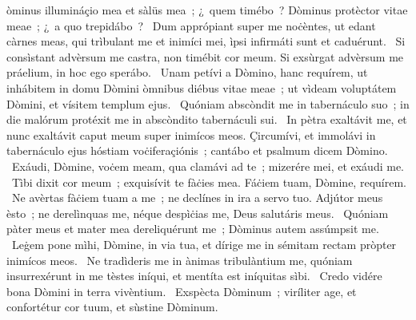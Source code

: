 \psalmChapterWithInscription{}
{ }
{%
òminus illumináçio mea et sàlüs mea~; ¿~quem timébo~? Dòminus protèctor vitae meae~; ¿~a quo trepidábo~? 
~Dum apprópiant super me noċèntes, ut edant càrnes meas, qui trìbulant me et inimíci mei, ìpsi infirmáti sunt et caduérunt. 
~Si consìstant advèrsum me castra, non timébit cor meum. Si exsùrgat advèrsum me práelium, in hoc ego sperábo. 
~Unam petívi a Dòmino, hanc requírem, ut inhábitem in domu Dòmini òmnibus diébus vitae meae~; ut vìdeam voluptátem Dòmini, et vísitem templum ejus. 
~Quóniam abscòndit me in tabernáculo suo~; in die malórum protéxit me in abscòndito tabernáculi sui. 
~In pètra exaltávit me, et nunc exaltávit caput meum super inimícos meos. Çircumívi, et immolávi in tabernáculo ejus hóstiam voċiferaçiónis~; cantábo et psalmum dicem Dòmino. 
~Exáudi, Dòmine, voċem meam, qua clamávi ad te~; mizerére mei, et exáudi me. 
~Tìbi dixit cor meum~; exquisívit te fàċies mea. Fáċiem tuam, Dòmine, requírem. 
~Ne avèrtas fàċiem tuam a me~; ne declínes in ira a servo tuo. Adjútor meus èsto~; ne derelìnquas me, néque despìċias me, Deus salutáris meus. 
~Quóniam pàter meus et mater mea dereliquérunt me~; Dòminus autem assúmpsit me. 
~Leġem pone mìhi, Dòmine, in via tua, et dírige me in sémitam rectam pròpter inimícos meos. 
~Ne tradìderis me in ànimas tribulàntium me, quóniam insurrexérunt in me tèstes iníqui, et mentíta est iníquitas sìbi. 
~Credo vidére bona Dòmini in terra vivèntium. 
~Exspècta Dòminum~; viríliter age, et confortétur cor tuum, et sùstine Dòminum. 
}

